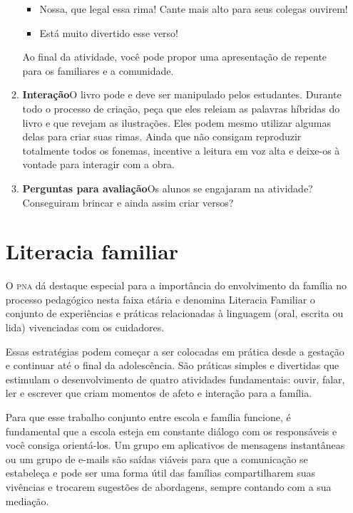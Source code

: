 \documentclass[11pt]{extarticle}
\begin{document}
\begin{enumerate}
\begin{enumerate}
\begin{itemize}
\item Nossa, que legal essa rima! Cante mais alto para seus colegas ouvirem!
\item Está muito divertido esse verso!
\end{itemize}

Ao final da atividade, você pode propor uma apresentação 
de repente para os familiares e a comunidade.

\item \textbf{Interação}\quad O livro pode e deve ser 
manipulado pelos estudantes. Durante todo o processo
de criação, peça que eles releiam as palavras híbridas 
do livro e que revejam as ilustrações. Eles podem mesmo 
utilizar algumas delas para criar suas rimas. 
Ainda que não consigam reproduzir totalmente todos
os fonemas, incentive a leitura em voz alta e deixe-os
à vontade para interagir com a obra.

\item \textbf{Perguntas para avaliação}\quad Os alunos se engajaram na atividade?
Conseguiram brincar e ainda assim criar versos? 
\end{enumerate}


\section{Literacia familiar}
O \textsc{pna} dá destaque especial para a importância do envolvimento da família 
no processo pedagógico nesta faixa etária e denomina Literacia Familiar o conjunto 
de experiências e práticas relacionadas à linguagem (oral, escrita ou lida) vivenciadas 
com os cuidadores. 

Essas estratégias podem começar a ser colocadas em prática desde a 
gestação e continuar até o final da adolescência. São práticas simples e divertidas 
que estimulam o desenvolvimento de quatro atividades fundamentais: ouvir, falar, 
ler e escrever que criam momentos de afeto e interação para a família. 

Para que esse trabalho conjunto entre escola e família funcione, é 
fundamental que a escola esteja em constante diálogo com os responsáveis e 
você consiga orientá-los. Um grupo em aplicativos de mensagens instantâneas ou um 
grupo de e-mails são saídas viáveis para que a comunicação se estabeleça e pode ser 
uma forma útil das famílias compartilharem suas vivências e trocarem sugestões 
de abordagens, sempre contando com a sua mediação. 


\end{enumerate}
\end{document}
